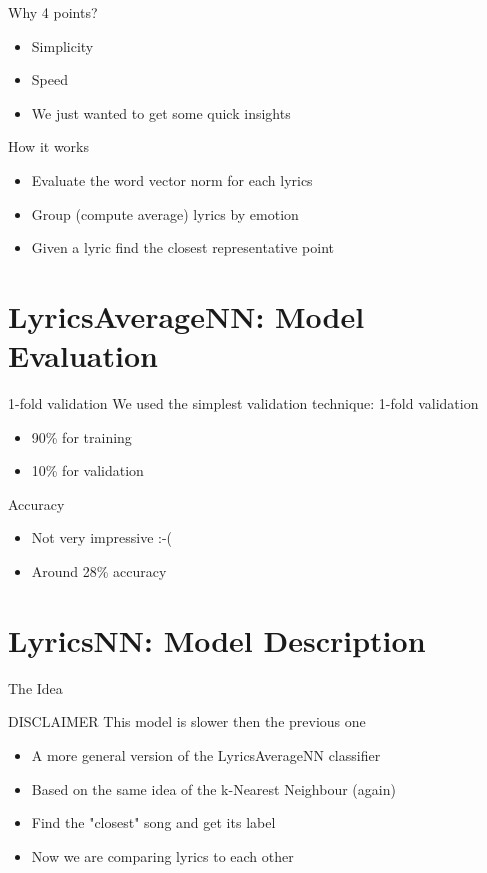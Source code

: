 \documentclass[xcolor=dvipsnames]{beamer}
\begin{document}
\begin{frame}{Why 4 points?}
\begin{itemize}
\item Simplicity
\item Speed
\item We just wanted to get some quick insights
\end{itemize}
\end{frame}

\begin{frame}{How it works}
\begin{itemize}
\item Evaluate the word vector norm for each lyrics
\item Group (compute average) lyrics by emotion
\item Given a lyric find the closest representative point
\end{itemize}
\end{frame}

\section{LyricsAverageNN: Model Evaluation}

\begin{frame}{1-fold validation}
We used the simplest validation technique: 1-fold validation
\begin{itemize}
\item 90\% for training
\item 10\% for validation
\end{itemize}
\end{frame}

\begin{frame}{Accuracy}
\begin{itemize}
\item Not very impressive :-(
\item Around 28\% accuracy
\end{itemize}
\end{frame}


\section{LyricsNN: Model Description}

\begin{frame}{The Idea}
\begin{block}{DISCLAIMER}
This model is slower then the previous one
\end{block}
\begin{itemize}
\item A more general version of the LyricsAverageNN classifier
\item Based on the same idea of the k-Nearest Neighbour (again)
\item Find the "closest" song and get its label
\item Now we are comparing lyrics to each other
\end{itemize}
\end{frame}
\end{document}
